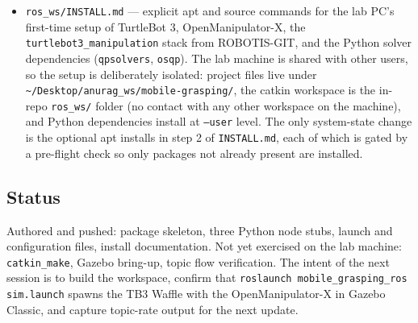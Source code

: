 \documentclass[11pt]{article}
\begin{document}
\begin{itemize}[noitemsep]
        launch for a full simulation bring-up.
  \item \texttt{ros\_ws/INSTALL.md} --- explicit apt and source
        commands for the lab PC's first-time setup of TurtleBot 3,
        OpenManipulator-X, the \texttt{turtlebot3\_manipulation}
        stack from ROBOTIS-GIT, and the Python solver dependencies
        (\texttt{qpsolvers}, \texttt{osqp}). The lab machine is
        shared with other users, so the setup is deliberately
        isolated: project files live under
        \texttt{\textasciitilde/Desktop/anurag\_ws/mobile-grasping/},
        the catkin workspace is the in-repo \texttt{ros\_ws/} folder
        (no contact with any other workspace on the machine), and
        Python dependencies install at \texttt{--user} level. The
        only system-state change is the optional apt installs in
        step 2 of \texttt{INSTALL.md}, each of which is gated by a
        pre-flight check so only packages not already present are
        installed.
\end{itemize}

\subsection{Status}

Authored and pushed: package skeleton, three Python node stubs,
launch and configuration files, install documentation. Not yet
exercised on the lab machine: \texttt{catkin\_make}, Gazebo bring-up,
topic flow verification. The intent of the next session is to build
the workspace, confirm that \texttt{roslaunch mobile\_grasping\_ros
sim.launch} spawns the TB3 Waffle with the OpenManipulator-X in
Gazebo Classic, and capture topic-rate output for the next update.
\end{document}
